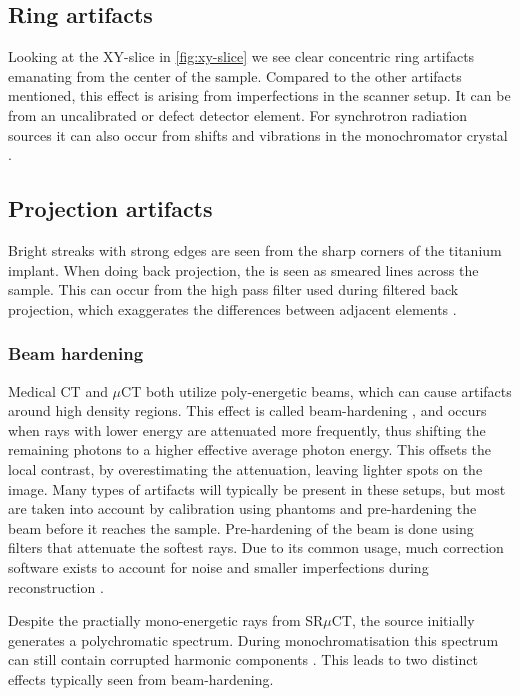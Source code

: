 \subsection{Ring artifacts}

Looking at the XY-slice in \cref{fig:xy-slice} we see clear concentric ring artifacts emanating from
the center of the sample. Compared to the other artifacts mentioned, this effect is arising from
imperfections in the scanner setup. It can be from an uncalibrated or defect detector element. For
synchrotron radiation sources it can also occur from shifts and vibrations in the monochromator
crystal \citep{ringartifacts}.

\subsection{Projection artifacts}

Bright streaks with strong edges are seen from the sharp corners of the titanium implant. When
doing back projection, the  is seen as smeared lines across the sample. This
can occur from the high pass filter used during filtered back projection, which exaggerates the
differences between adjacent elements \citep{ctnoise}.

\subsubsection{Beam hardening}

Medical CT and $\mu$CT both utilize poly-energetic beams, which can cause artifacts around high
density regions. This effect is called beam-hardening , and occurs when rays with
lower energy are attenuated more frequently, thus shifting the remaining photons to a higher
effective average photon energy. This offsets the local contrast, by overestimating
the attenuation, leaving lighter spots on the image. Many types of artifacts will typically be
present in these setups, but most are taken into account by calibration using phantoms and
pre-hardening the beam before it reaches the sample. Pre-hardening of the beam is done using
filters that attenuate the softest rays. Due to its common usage, much correction software exists
to account for noise and smaller imperfections during reconstruction .

Despite the practially mono-energetic rays from SR$\mu$CT, the source initially generates a
polychromatic spectrum. During monochromatisation this spectrum can still contain corrupted harmonic
components \citep{srnoise}. This leads to two distinct effects typically seen from beam-hardening.

